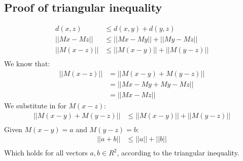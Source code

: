 \documentclass[a4paper,10pt]{article}
\begin{document}
\subsection*{Proof of triangular inequality}
\begin{align*}
d(x,z) &\leq d(x,y) + d(y,z)\\
||Mx-Mz|| &\leq ||Mx-My|| + ||My-Mz||\\
||M(x-z)|| &\leq ||M(x-y)|| + ||M(y-z)||\\
\end{align*}
We know that:
\begin{align*}
||M(x-z)|| &= ||M(x-y) + M(y-z)||\\
           &= ||Mx-My+My-Mz||\\
	   &= ||Mx-Mz||
\end{align*}
We substitute in for $M(x-z)$:
\begin{align*}
||M(x-y) + M(y-z)|| &\leq ||M(x-y)|| + ||M(y-z)||\\
\end{align*}
Given $M(x-y)=a$ and $M(y-z)=b$:
\begin{align*}
||a + b|| &\leq ||a|| + ||b||\\
\end{align*}
Which holds for all vectors $a,b\in R^2$, according to
the triangular inequality.
\end{document}
